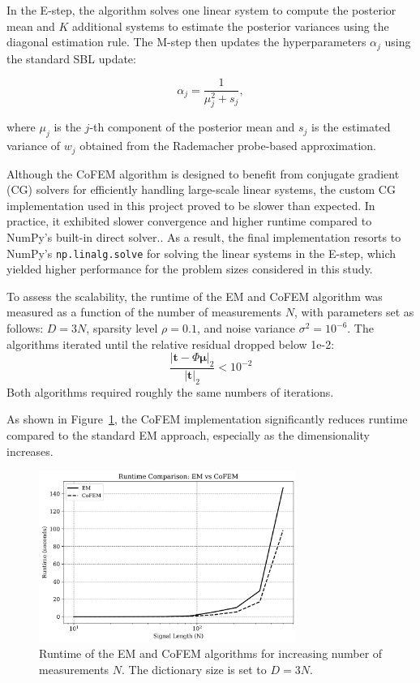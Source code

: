 \documentclass{article}
\begin{document}
In the E-step, the algorithm solves one linear system to compute the posterior mean and $ K $ additional systems to estimate the posterior variances using the diagonal estimation rule. The M-step then updates the hyperparameters $ \alpha_j $ using the standard SBL update:

\begin{equation}
    \alpha_j = \frac{1}{\mu_j^2 + s_j},
\end{equation}

where $ \mu_j $ is the $ j $-th component of the posterior mean and $ s_j $ is the estimated variance of $ w_j $ obtained from the Rademacher probe-based approximation.

Although the CoFEM algorithm is designed to benefit from conjugate gradient (CG) solvers for efficiently handling large-scale linear systems, the custom CG implementation used in this project proved to be slower than expected. In practice, it exhibited slower convergence and higher runtime compared to NumPy’s built-in direct solver.. As a result, the final implementation resorts to NumPy’s \texttt{np.linalg.solve} for solving the linear systems in the E-step, which yielded higher performance for the problem sizes considered in this study.

To assess the scalability, the runtime of the EM and CoFEM algorithm was measured as a function of the number of measurements $ N $, with parameters set as follows:  $ D = 3N $, sparsity level $ \rho = 0.1 $, and noise variance $ \sigma^2 = 10^{-6} $. The algorithms iterated until the relative residual dropped below 1e-2:
\begin{equation}
\frac{|\mathbf{t} - \Phi \boldsymbol{\mu}|_2}{|\mathbf{t}|_2} < 10^{-2}
\end{equation}
Both algorithms required roughly the same numbers of iterations.

As shown in Figure~\ref{fig:runtime_comparison}, the CoFEM implementation significantly reduces runtime compared to the standard EM approach, especially as the dimensionality increases.

\begin{figure}[H]
    \centering
    \includegraphics[width=0.75\textwidth]{Figures/runtime_comp.png}
    \caption{Runtime of the EM and CoFEM algorithms for increasing number of measurements $ N $. The dictionary size is set to $ D = 3N $.}
    \label{fig:runtime_comparison}
\end{figure}
\end{document}
